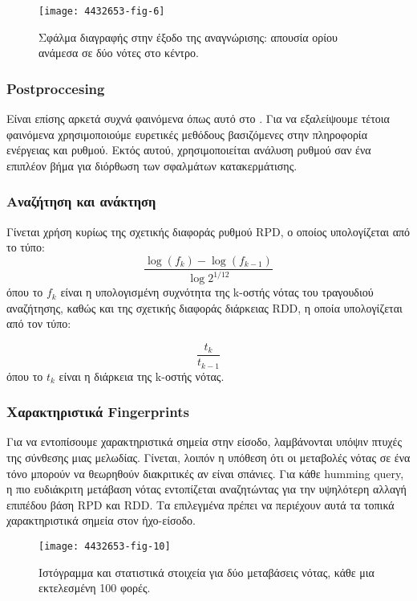 \begin{figure}
        \centering
        \texttt{[image: 4432653-fig-6]}
        \caption{Σφάλμα διαγραφής στην έξοδο της αναγνώρισης: απουσία ορίου ανάμεσα σε δύο νότες στο κέντρο.}
        \label{fig:4432653-fig-6}
\end{figure}

\subsubsection{Postproccesing}
Είναι επίσης αρκετά συχνά φαινόμενα όπως αυτό στο .
Για να εξαλείψουμε τέτοια φαινόμενα χρησιμοποιούμε ευρετικές μεθόδους βασιζόμενες στην
πληροφορία ενέργειας και ρυθμού. Εκτός αυτού, χρησιμοποιείται ανάλυση ρυθμού
σαν ένα επιπλέον βήμα για διόρθωση των σφαλμάτων κατακερμάτισης.

\subsubsection{Αναζήτηση και ανάκτηση}
Γίνεται χρήση κυρίως της σχετικής διαφοράς ρυθμού RPD, ο οποίος υπολογίζεται
από το τύπο:
\begin{equation*}
\dfrac{\log(f_k)-\log(f_{k-1})}{\log2^{1/12}}
\end{equation*}
όπου το $f_{k}$ είναι η υπολογισμένη συχνότητα της k-οστής νότας του τραγουδιού
αναζήτησης, καθώς και της σχετικής διαφοράς διάρκειας RDD, η οποία υπολογίζεται
από τον τύπο:

\begin{equation*}
\dfrac{t_k}{t_{k-1}}
\end{equation*}
όπου το $t_{k}$ είναι η διάρκεια της k-οστής νότας.

\subsubsection{Χαρακτηριστικά Fingerprints}
Για να εντοπίσουμε χαρακτηριστικά σημεία στην είσοδο, λαμβάνονται υπόψιν πτυχές
της σύνθεσης μιας μελωδίας. Γίνεται, λοιπόν η υπόθεση ότι οι μεταβολές νότας σε
ένα τόνο μπορούν να θεωρηθούν διακριτικές αν είναι σπάνιες. Για κάθε humming
query, η πιο ευδιάκριτη μετάβαση νότας εντοπίζεται αναζητώντας για την υψηλότερη
αλλαγή επιπέδου βάση RPD και RDD. Τα επιλεγμένα \fps{} πρέπει να περιέχουν αυτά
τα τοπικά χαρακτηριστικά σημεία στον ήχο-είσοδο.

\begin{wrapfigure}{R}{0.5\textwidth}
        \centering
        \vspace{-20pt}\texttt{[image: 4432653-fig-10]}
        \vspace{-20pt}\caption{Ιστόγραμμα και στατιστικά στοιχεία για δύο μεταβάσεις νότας, κάθε μια εκτελεσμένη 100 φορές.}
        \label{fig:4432653-fig-10}
\end{wrapfigure}

